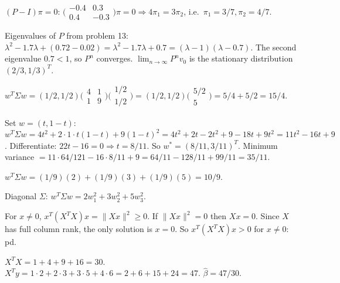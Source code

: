 \begin{solutions}
  \item $(P - I)\pi = 0$:
        $\bigl(\begin{smallmatrix} -0.4 & 0.3 \\ 0.4 & -0.3 \end{smallmatrix}\bigr)\pi = 0 \Rightarrow 4 \pi_{1} = 3 \pi_{2}$,
        i.e.\ $\pi_{1} = 3/7, \pi_{2} = 4/7$.

  \item Eigenvalues of $P$ from problem 13:
        $\lambda^{2} - 1.7 \lambda + (0.72 - 0.02) = \lambda^{2} - 1.7 \lambda + 0.7 = (\lambda - 1)(\lambda - 0.7)$.
        The second eigenvalue $0.7 < 1$, so $P^{n}$ converges.
        $\lim_{n \to \infty} P^{n} v_{0}$ is the stationary distribution
        $(2/3, 1/3)^{T}$.

  \item $w^{T} \Sigma w = (1/2, 1/2)\bigl(\begin{smallmatrix} 4 & 1 \\ 1 & 9 \end{smallmatrix}\bigr)\bigl(\begin{smallmatrix} 1/2 \\ 1/2 \end{smallmatrix}\bigr) = (1/2, 1/2)\bigl(\begin{smallmatrix} 5/2 \\ 5 \end{smallmatrix}\bigr) = 5/4 + 5/2 = 15/4$.

  \item Set $w = (t, 1 - t)$:
        $w^{T} \Sigma w = 4 t^{2} + 2 \cdot 1 \cdot t(1 - t) + 9(1 - t)^{2} = 4 t^{2} + 2 t - 2 t^{2} + 9 - 18 t + 9 t^{2} = 11 t^{2} - 16 t + 9$.
        Differentiate: $22 t - 16 = 0 \Rightarrow t = 8/11$. So
        $w^{*} = (8/11, 3/11)^{T}$. Minimum variance
        $= 11 \cdot 64/121 - 16 \cdot 8/11 + 9 = 64/11 - 128/11 + 99/11 = 35/11$.

  \item $w^{T} \Sigma w = (1/9)(2) + (1/9)(3) + (1/9)(5) = 10/9$.

  \item Diagonal $\Sigma$:
        $w^{T} \Sigma w = 2 w_{1}^{2} + 3 w_{2}^{2} + 5 w_{3}^{2}$.

  \item For $x \neq 0$, $x^{T}(X^{T} X)x = \|X x\|^{2} \ge 0$. If
        $\|X x\|^{2} = 0$ then $X x = 0$. Since $X$ has full column rank,
        the only solution is $x = 0$. So $x^{T}(X^{T} X)x > 0$ for
        $x \neq 0$: pd.

  \item $X^{T} X = 1 + 4 + 9 + 16 = 30$.
        $X^{T} y = 1 \cdot 2 + 2 \cdot 3 + 3 \cdot 5 + 4 \cdot 6 = 2 + 6 + 15 + 24 = 47$.
        $\hat{\beta} = 47/30$.


\end{solutions}
